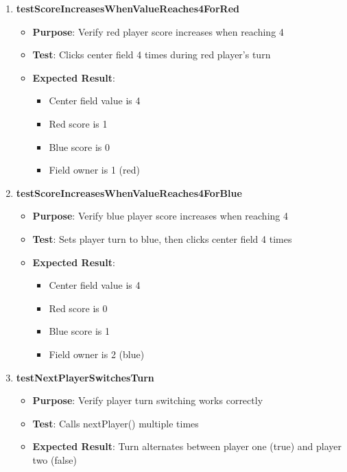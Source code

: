 \documentclass[12pt,a4paper]{article}
\begin{document}
\begin{enumerate}
    \item \textbf{testScoreIncreasesWhenValueReaches4ForRed}
    \begin{itemize}
        \item \textbf{Purpose}: Verify red player score increases when reaching 4
        \item \textbf{Test}: Clicks center field 4 times during red player's turn
        \item \textbf{Expected Result}: 
        \begin{itemize}
            \item Center field value is 4
            \item Red score is 1
            \item Blue score is 0
            \item Field owner is 1 (red)
        \end{itemize}
    \end{itemize}
    
    \item \textbf{testScoreIncreasesWhenValueReaches4ForBlue}
    \begin{itemize}
        \item \textbf{Purpose}: Verify blue player score increases when reaching 4
        \item \textbf{Test}: Sets player turn to blue, then clicks center field 4 times
        \item \textbf{Expected Result}: 
        \begin{itemize}
            \item Center field value is 4
            \item Red score is 0
            \item Blue score is 1
            \item Field owner is 2 (blue)
        \end{itemize}
    \end{itemize}
    
    \item \textbf{testNextPlayerSwitchesTurn}
    \begin{itemize}
        \item \textbf{Purpose}: Verify player turn switching works correctly
        \item \textbf{Test}: Calls nextPlayer() multiple times
        \item \textbf{Expected Result}: Turn alternates between player one (true) and player two (false)
    \end{itemize}
    

\end{enumerate}
\end{document}
